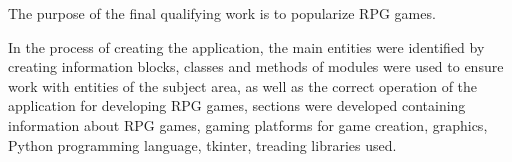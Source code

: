 The purpose of the final qualifying work is to popularize RPG games.

In the process of creating the application, the main entities were identified by creating information blocks, classes and methods of modules were used to ensure work with entities of the subject area, as well as the correct operation of the application for developing RPG games, sections were developed containing information about RPG games, gaming platforms for game creation, graphics, Python programming language, tkinter, treading libraries used.

